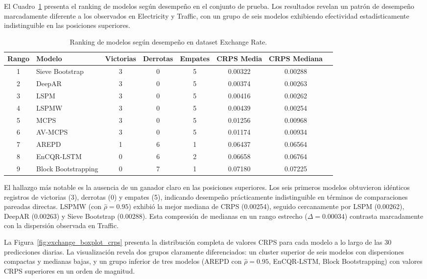 El Cuadro~\ref{tab:exchange_ranking} presenta el ranking de modelos según desempeño en el conjunto de prueba. Los resultados revelan un patrón de desempeño marcadamente diferente a los observados en Electricity y Traffic, con un grupo de seis modelos exhibiendo efectividad estadísticamente indistinguible en las posiciones superiores.

\begin{table}[htbp]
\centering
\caption{Ranking de modelos según desempeño en dataset Exchange Rate.}
\label{tab:exchange_ranking}
\small
\begin{tabular}{clcccccc}
\toprule
\textbf{Rango} & \textbf{Modelo} & \textbf{Victorias} & \textbf{Derrotas} & \textbf{Empates} & \textbf{CRPS Media} & \textbf{CRPS Mediana} \\
\midrule
1 & Sieve Bootstrap & 3 & 0 & 5 & 0.00322 & 0.00288 \\
2 & DeepAR & 3 & 0 & 5 & 0.00374 & 0.00263 \\
3 & LSPM & 3 & 0 & 5 & 0.00416 & 0.00262 \\
4 & LSPMW & 3 & 0 & 5 & 0.00439 & 0.00254 \\
5 & MCPS & 3 & 0 & 5 & 0.01256 & 0.00968 \\
6 & AV-MCPS & 3 & 0 & 5 & 0.01174 & 0.00934 \\
7 & AREPD & 1 & 6 & 1 & 0.06437 & 0.06564 \\
8 & EnCQR-LSTM & 0 & 6 & 2 & 0.06658 & 0.06764 \\
9 & Block Bootstrapping & 0 & 7 & 1 & 0.07180 & 0.07225 \\
\bottomrule
\end{tabular}
\end{table}

El hallazgo más notable es la ausencia de un ganador claro en las posiciones superiores. Los seis primeros modelos obtuvieron idénticos registros de victorias (3), derrotas (0) y empates (5), indicando desempeño prácticamente indistinguible en términos de comparaciones pareadas directas. LSPMW (con $\hat{\rho} = 0.95$) exhibió la mejor mediana de CRPS (0.00254), seguido cercanamente por LSPM (0.00262), DeepAR (0.00263) y Sieve Bootstrap (0.00288). Esta compresión de medianas en un rango estrecho ($\Delta = 0.00034$) contrasta marcadamente con la dispersión observada en Traffic.

La Figura~\ref{fig:exchange_boxplot_crps} presenta la distribución completa de valores CRPS para cada modelo a lo largo de las 30 predicciones diarias. La visualización revela dos grupos claramente diferenciados: un cluster superior de seis modelos con dispersiones compactas y medianas bajas, y un grupo inferior de tres modelos (AREPD con $\hat{\rho} = 0.95$, EnCQR-LSTM, Block Bootstrapping) con valores CRPS superiores en un orden de magnitud.

